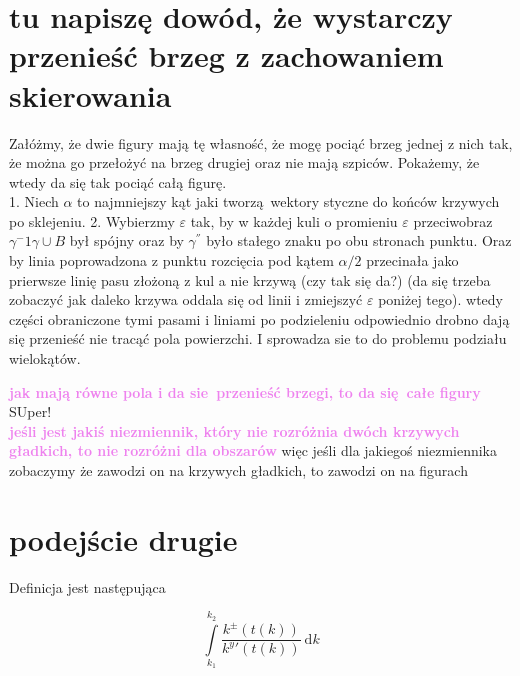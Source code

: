 \documentclass[a4paper, 12pt]{article}
\newcommand{\content}[1]{\hfill \break \textbf{\large \textcolor{violet}{#1} \hfill \break}\normalsize}
\begin{document}
\section{tu napiszę dowód, że wystarczy przenieść brzeg z zachowaniem skierowania}

Załóżmy, że dwie figury mają tę własność, że mogę pociąć brzeg jednej z nich tak, że można go przełożyć na
brzeg drugiej oraz nie mają szpiców. Pokażemy, że wtedy da się tak pociąć całą figurę. \\
1. Niech $\alpha$ to najmniejszy kąt jaki tworzą wektory styczne do końców krzywych po sklejeniu.
2. Wybierzmy $\varepsilon$ tak, by w każdej kuli o promieniu $\varepsilon$ przeciwobraz $\gamma^-{1}\gamma
\cup B$ był spójny oraz by $\gamma^{''}$ było stałego znaku po obu stronach punktu. Oraz by linia
poprowadzona z punktu rozcięcia pod kątem $\alpha/2$ przecinała jako prierwsze linię pasu złożoną z kul a
nie krzywą (czy tak się da?) (da się trzeba zobaczyć jak daleko krzywa oddala się od linii i zmiejszyć
$\varepsilon$ poniżej tego). wtedy części obraniczone tymi pasami i liniami po podzieleniu odpowiednio
drobno dają się przenieść nie tracąć pola powierzchi. I sprowadza sie to do problemu podziału wielokątów.

\content{jak mają równe pola i da sie przenieść brzegi, to da się całe figury}
SUper! \\
\content{jeśli jest jakiś niezmiennik, który nie rozróżnia dwóch krzywych gładkich, to nie rozróżni dla
obszarów}
więc jeśli dla jakiegoś niezmiennika zobaczymy że zawodzi on na krzywych gładkich, to zawodzi on na
figurach \\

\section{podejście drugie}


Definicja jest następująca


\begin{equation}
    \displaystyle\int\limits_{k_1}^{k_2}\frac{k^\pm(t(k))}{{k^y}'(t(k))}\ \text{d}k
\end{equation}
\end{document}
